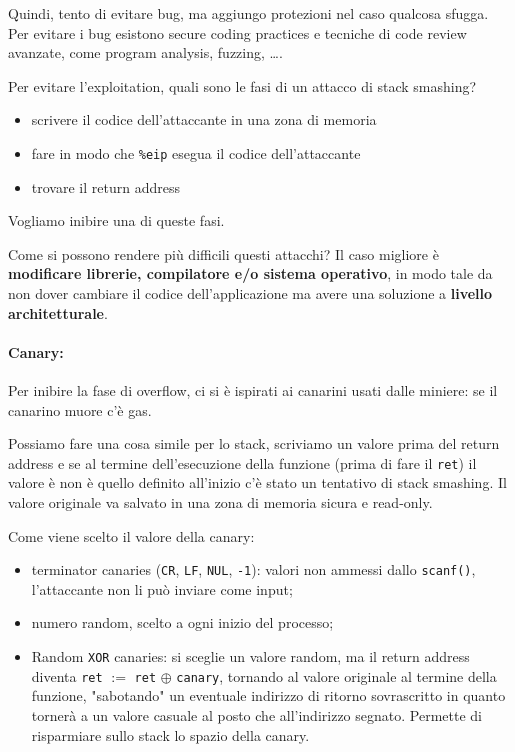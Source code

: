 Quindi, tento di evitare bug, ma aggiungo protezioni nel caso qualcosa sfugga. Per evitare i bug esistono secure coding practices e tecniche di code review avanzate, come program analysis, fuzzing, \dots.

Per evitare l'exploitation, quali sono le fasi di un attacco di stack smashing?
\begin{itemize}
	\item scrivere il codice dell'attaccante in una zona di memoria
	
    \item fare in modo che \texttt{\%eip} esegua il codice dell'attaccante
	
    \item trovare il return address
\end{itemize}
Vogliamo inibire una di queste fasi.

Come si possono rendere più difficili questi attacchi? Il caso migliore è \textbf{modificare librerie, compilatore e/o sistema operativo}, in modo tale da non dover cambiare il codice dell'applicazione ma avere una soluzione a \textbf{livello architetturale}.

\paragraph{Canary:} Per inibire la fase di overflow, ci si è ispirati ai canarini usati dalle miniere: se il canarino muore c'è gas. 

Possiamo fare una cosa simile per lo stack, scriviamo un valore prima del return address e se al termine dell'esecuzione della funzione (prima di fare il \texttt{ret}) il valore è non è quello definito all'inizio c'è stato un tentativo di stack smashing. Il valore originale va salvato in una zona di memoria sicura e read-only.

Come viene scelto il valore della canary: 
\begin{itemize}
	\item terminator canaries (\texttt{CR}, \texttt{LF}, \texttt{NUL}, \texttt{-1}): valori non ammessi dallo \texttt{scanf()}, l'attaccante non li può inviare come input;
	
    \item numero random, scelto a ogni inizio del processo;
	
    \item Random \texttt{XOR} canaries: si sceglie un valore random, ma il return address diventa \texttt{ret} $:=$ \texttt{ret} $\oplus$ \texttt{canary}, tornando al valore originale al termine della funzione, "sabotando" un eventuale indirizzo di ritorno sovrascritto in quanto tornerà a un valore casuale al posto che all'indirizzo segnato. Permette di risparmiare sullo stack lo spazio della canary.
\end{itemize}

